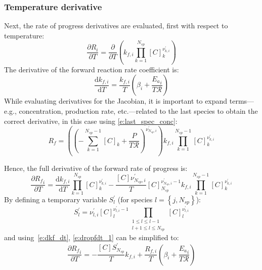 \documentclass[12pt,number,sort&compress]{elsarticle}
\newcommand{\ns}{N_{sp}}
\newcommand{\Ru}{\mathcal{R}}
\begin{document}
\subsubsection{Temperature derivative}
\label{s:dri_dt}
Next, the rate of progress derivatives are evaluated, first with respect to temperature:
\begin{equation}
 \frac{\partial R_{i}}{\partial T } = \frac{\partial}{\partial T}\left({k_{f, i}} \prod_{k=1}^{\ns} [C]_{k}^{\nu^{\prime}_{k,i}}\right)
\end{equation}
The derivative of the forward reaction rate coefficient is:
\begin{equation}
 \label{e:dkf_dt}
 \frac{\text{d} k_{f, i} }{\text{d} T } = \frac{{k_{f, i}}}{T} \left(\beta_{i} + \frac{{E_{a}}_{i}}{T \Ru}\right)
\end{equation}
While evaluating derivatives for the Jacobian, it is important to expand terms---e.g., concentration, production rate, etc.---related to the last species to obtain the correct derivative, in this case using \cref{e:last_spec_conc}:
\begin{equation}
 {R_f} = \left(\left(- \sum_{k=1}^{\ns  - 1} [C]_{k} + \frac{P}{T \Ru}\right)^{\nu^{\prime}_{\ns,i}}\right) {k_{f, i}} \prod_{k=1}^{\ns  - 1} [C]_{k}^{\nu^{\prime}_{k,i}}
\end{equation}

Hence, the full derivative of the forward rate of progress is:
\begin{equation}
 \label{e:dropfdt_1}
 \frac{\partial {R_f} _{i}}{\partial T } = \frac{\text{d} k_{f, i} }{\text{d} T } \prod_{k=1}^{\ns} [C]_{k}^{\nu^{\prime}_{k,i}} - \frac{[C] \nu^{\prime}_{\ns,i}}{T} [C]_{\ns}^{\nu^{\prime}_{\ns,i} - 1} {k_{f, i}} \prod_{k=1}^{\ns  - 1} [C]_{k}^{\nu^{\prime}_{k,i}}
\end{equation}
By defining a temporary variable $S^{\prime}_{l}$ (for species $l = \left\{j, \ns\right\}$):
\begin{equation}
 \label{e:s_temp}
 S^{\prime}_{l} = \nu^{\prime}_{l,i} [C]_{l}^{\nu^{\prime}_{l,i} - 1} \prod_{\substack{1 \leq l \leq l - 1\\l + 1 \leq l \leq \ns}} [C]_{l}^{\nu^{\prime}_{l,i}}
\end{equation}
and using~\cref{e:dkf_dt}, \cref{e:dropfdt_1} can be simplified to:
\begin{equation}
 \label{e:dropf_dt}
 \frac{\partial {R_f}_{i}}{\partial T } = - \frac{[C] S^{\prime}_{\ns}}{T} {k_{f, i}} + \frac{{R_{f, i}}}{T} \left(\beta_{i} + \frac{{E_{a}}_{i}}{T \Ru}\right)
\end{equation}
\end{document}
